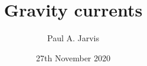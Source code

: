 \documentclass{beamer}
\title[Modeling volcanic processes]{Gravity currents} %
\author[Paul Jarvis]{Paul A. Jarvis} %
\institute[UNIGE] %
{
\textit{paul.jarvis@unige.ch} %
}
\date{27th November 2020} %
\begin{document}
\begin{frame}
\titlepage %
\end{frame}





\end{document}
